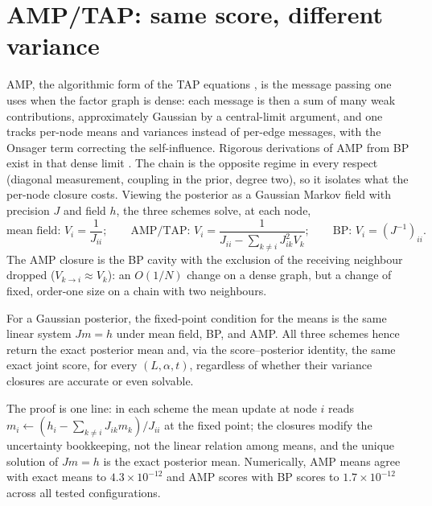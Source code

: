 \section{AMP/TAP: same score, different variance}\label{sec:bp-amp}

AMP, the algorithmic form of the TAP equations
\citep{thouless1977solution, donoho2009message, zdeborova2016statistical},
is the message passing one uses when the factor graph is dense: each
message is then a sum of many weak contributions, approximately Gaussian
by a central-limit argument, and one tracks per-node means and variances
instead of per-edge messages, with the Onsager term correcting the
self-influence. Rigorous derivations of AMP from BP exist in that dense
limit \citep{genovese2026amp}. The chain is the opposite regime in every
respect (diagonal measurement, coupling in the prior, degree two), so it
isolates what the per-node closure costs. Viewing the posterior as a
Gaussian Markov field with precision $J$ and field $h$, the three schemes
solve, at each node,
\begin{equation}
  \text{mean field: } V_i = \frac{1}{J_{ii}};
  \qquad
  \text{AMP/TAP: } V_i = \frac{1}{J_{ii} - \sum_{k \neq i} J_{ik}^2 V_k};
  \qquad
  \text{BP: } V_i = (J^{-1})_{ii} .
  \label{eq:bp-three-closures}
\end{equation}
The AMP closure is the BP cavity with the exclusion of the receiving
neighbour dropped ($V_{k \to i} \approx V_k$): an $O(1/N)$ change on a
dense graph, but a change of fixed, order-one size on a chain with
two neighbours.

\begin{theorem}\label{thm:bp-same-score}
For a Gaussian posterior, the fixed-point condition for the means is the
same linear system $J m = h$ under mean field, BP, and AMP. All three
schemes hence return the exact posterior mean and, via the
score--posterior identity, the same exact joint score, for every
$(L, \alpha, t)$, regardless of whether their variance closures are
accurate or even solvable.
\end{theorem}

The proof is one line: in each scheme the mean update at node $i$ reads
$m_i \leftarrow (h_i - \sum_{k \neq i} J_{ik} m_k)/J_{ii}$ at the fixed
point; the closures modify the uncertainty bookkeeping, not the linear
relation among means, and the unique solution of $Jm = h$ is the exact
posterior mean. Numerically, AMP means agree with exact means to
$4.3 \times 10^{-12}$ and AMP scores with BP scores to
$1.7 \times 10^{-12}$ across all tested configurations.

